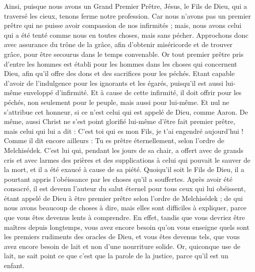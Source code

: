 \begin{multicols}{2}
Ainsi, puisque nous avons un Grand Premier Prêtre, Jésus, le Fils de Dieu, qui a traversé les cieux, tenons ferme notre profession.
Car nous n'avons pas un premier prêtre qui ne puisse avoir compassion de nos infirmités ; mais, nous avons celui qui a été tenté comme nous en toutes choses, mais sans pécher.
Approchons donc avec assurance du trône de la grâce, afin d'obtenir miséricorde et de trouver grâce, pour être secourus dans le temps convenable.
\VerseOne{}Or tout premier prêtre pris d'entre les hommes est établi pour les hommes dans les choses qui concernent Dieu, afin qu'il offre des dons et des sacrifices pour les péchés.
Etant capable d'avoir de l'indulgence pour les ignorants et les égarés, puisqu'il est aussi lui-même enveloppé d'infirmité.
Et à cause de cette infirmité, il doit offrir pour les péchés, non seulement pour le peuple, mais aussi pour lui-même.
Et nul ne s'attribue cet honneur, si ce n'est celui qui est appelé de Dieu, comme Aaron.
De même, aussi Christ ne s'est point glorifié lui-même d'être fait premier prêtre, mais celui qui lui a dit : C'est toi qui es mon Fils, je t'ai engendré aujourd'hui !
Comme il dit encore ailleurs : Tu es prêtre éternellement, selon l'ordre de Melchisédek.
C'est lui qui, pendant les jours de sa chair, a offert avec de grands cris et avec larmes des prières et des supplications à celui qui pouvait le sauver de la mort, et il a été exaucé à cause de sa piété.
Quoiqu'il soit le Fils de Dieu, il a pourtant appris l'obéissance par les choses qu'il a souffertes.
Après avoir été consacré, il est devenu l'auteur du salut éternel pour tous ceux qui lui obéissent,
étant appelé de Dieu à être premier prêtre selon l'ordre de Melchisédek ;
de qui nous avons beaucoup de choses à dire, mais elles sont difficiles à expliquer, parce que vous êtes devenus lents à comprendre.
En effet, tandis que vous devriez être maîtres depuis longtemps, vous avez encore besoin qu'on vous enseigne quels sont les premiers rudiments des oracles de Dieu, et vous êtes devenus tels, que vous avez encore besoin de lait et non d'une nourriture solide.
Or, quiconque use de lait, ne sait point ce que c'est que la parole de la justice, parce qu'il est un enfant.

\end{multicols}
